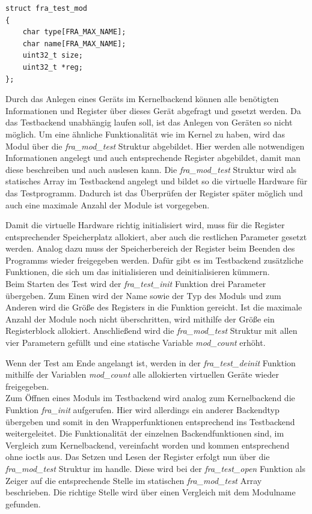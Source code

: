 \begin{lstfloat}
\begin{lstlisting}
struct fra_test_mod
{
	char type[FRA_MAX_NAME];
	char name[FRA_MAX_NAME];
	uint32_t size;
	uint32_t *reg;
};
\end{lstlisting}
\end{lstfloat}

Durch das Anlegen eines Geräts im Kernelbackend können alle benötigten Informationen und Register über dieses Gerät abgefragt und gesetzt werden. Da das Testbackend unabhängig laufen soll, ist das Anlegen von Geräten so nicht möglich. Um eine ähnliche Funktionalität wie im Kernel zu haben, wird das Modul über die \textit{fra\_mod\_test} Struktur abgebildet. Hier werden alle notwendigen Informationen angelegt und auch entsprechende Register abgebildet, damit man diese beschreiben und auch auslesen kann.
Die \textit{fra\_mod\_test} Struktur wird als statisches Array im Testbackend angelegt und bildet so die virtuelle Hardware für das Testprogramm. Dadurch ist das Überprüfen der Register später möglich und auch eine maximale Anzahl der Module ist vorgegeben. 


Damit die virtuelle Hardware richtig initialisiert wird, muss für die Register entsprechender Speicherplatz allokiert, aber auch die restlichen Parameter gesetzt werden. Analog dazu muss der Speicherbereich der Register beim Beenden des Programms wieder freigegeben werden. Dafür gibt es im Testbackend zusätzliche Funktionen, die sich um das initialisieren und deinitialisieren kümmern.\\

 
Beim Starten des Test wird der \textit{fra\_test\_init} Funktion drei Parameter übergeben. Zum Einen wird der Name sowie der Typ des Moduls und zum Anderen wird die Größe des Registers in die Funktion gereicht. Ist die maximale Anzahl der Module noch nicht überschritten, wird mithilfe der Größe ein Registerblock allokiert. Anschließend wird die \textit{fra\_mod\_test} Struktur mit allen vier Parametern gefüllt und eine statische Variable \textit{mod\_count} erhöht.

Wenn der Test am Ende angelangt ist, werden in der \textit{fra\_test\_deinit} Funktion mithilfe der Variablen \textit{mod\_count} alle allokierten virtuellen Geräte wieder freigegeben.\\


Zum Öffnen eines Moduls im Testbackend wird analog zum Kernelbackend die Funktion \textit{fra\_init} aufgerufen. Hier wird allerdings ein anderer Backendtyp übergeben und somit in den Wrapperfunktionen entsprechend ins Testbackend weitergeleitet. 
Die Funktionalität der einzelnen Backendfunktionen sind, im Vergleich zum Kernelbackend, vereinfacht worden und kommen entsprechend ohne \ac{ioctl}s aus. Das Setzen und Lesen der Register erfolgt nun über die \textit{fra\_mod\_test} Struktur im \gls{handle}. Diese wird bei der \textit{fra\_test\_open} Funktion als Zeiger auf die entsprechende Stelle im statischen \textit{fra\_mod\_test} Array beschrieben. Die richtige Stelle wird über einen Vergleich mit dem Modulname gefunden.\\



